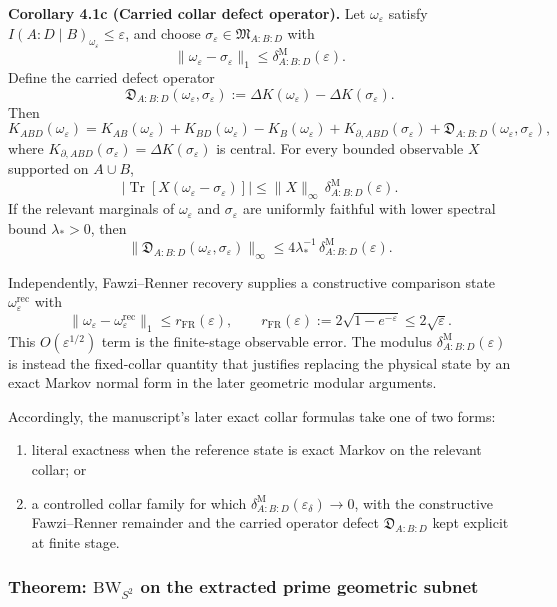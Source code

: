 \textbf{Corollary 4.1c (Carried collar defect operator).} Let \(\omega_\varepsilon\) satisfy \(I(A:D\mid B)_{\omega_\varepsilon}\le \varepsilon\), and choose \(\sigma_\varepsilon\in\mathfrak M_{A:B:D}\) with
\[
\|\omega_\varepsilon-\sigma_\varepsilon\|_1
\le
\delta^{\mathrm M}_{A:B:D}(\varepsilon).
\]
Define the carried defect operator
\[
\mathfrak D_{A:B:D}(\omega_\varepsilon,\sigma_\varepsilon)
:=
\Delta K(\omega_\varepsilon)-\Delta K(\sigma_\varepsilon).
\]
Then
\[
K_{ABD}(\omega_\varepsilon)
=
K_{AB}(\omega_\varepsilon)+K_{BD}(\omega_\varepsilon)-K_B(\omega_\varepsilon)
+K_{\partial,ABD}(\sigma_\varepsilon)
+\mathfrak D_{A:B:D}(\omega_\varepsilon,\sigma_\varepsilon),
\]
where \(K_{\partial,ABD}(\sigma_\varepsilon)=\Delta K(\sigma_\varepsilon)\) is central. For every bounded observable \(X\) supported on \(A\cup B\),
\[
\left|
\operatorname{Tr}\!\left[X(\omega_\varepsilon-\sigma_\varepsilon)\right]
\right|
\le
\|X\|_\infty\,\delta^{\mathrm M}_{A:B:D}(\varepsilon).
\]
If the relevant marginals of \(\omega_\varepsilon\) and \(\sigma_\varepsilon\) are uniformly faithful with lower spectral bound \(\lambda_\ast>0\), then
\[
\|\mathfrak D_{A:B:D}(\omega_\varepsilon,\sigma_\varepsilon)\|_\infty
\le
4\lambda_\ast^{-1}\,\delta^{\mathrm M}_{A:B:D}(\varepsilon).
\]

Independently, Fawzi--Renner recovery supplies a constructive comparison state \(\omega^{\mathrm{rec}}_\varepsilon\) with
\[
\|\omega_\varepsilon-\omega^{\mathrm{rec}}_\varepsilon\|_1
\le
r_{\mathrm{FR}}(\varepsilon),
\qquad
r_{\mathrm{FR}}(\varepsilon):=2\sqrt{1-e^{-\varepsilon}}\le 2\sqrt{\varepsilon}.
\]
This \(O(\varepsilon^{1/2})\) term is the finite-stage observable error. The modulus \(\delta^{\mathrm M}_{A:B:D}(\varepsilon)\) is instead the fixed-collar quantity that justifies replacing the physical state by an exact Markov normal form in the later geometric modular arguments.

Accordingly, the manuscript's later exact collar formulas take one of two forms:
\begin{enumerate}
\item literal exactness when the reference state is exact Markov on the relevant collar; or
\item a controlled collar family for which \(\delta^{\mathrm M}_{A:B:D}(\varepsilon_\delta)\to0\), with the constructive Fawzi--Renner remainder and the carried operator defect \(\mathfrak D_{A:B:D}\) kept explicit at finite stage.
\end{enumerate}
\subsubsection{\texorpdfstring{Theorem: \(\mathrm{BW}_{S^2}\) on the extracted prime geometric subnet}{4.2 Theorem: \textbackslash mathrm\{BW\}\_\{S\^{}2\} on the extracted prime geometric subnet}}\label{42-theorem-mathrmbw_s2-from-markov-locality-symmetry-regularity}

